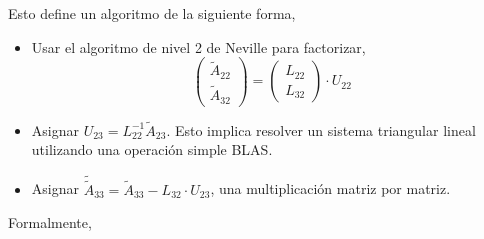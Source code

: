 \documentclass[a4paper,12pt]{article}
\begin{document}
Esto define un algoritmo de la siguiente forma, 

\begin{itemize}
	\item Usar el algoritmo de nivel 2 de Neville para factorizar,
	$$\begin{pmatrix} \widetilde{A}_{22}\\ \widetilde{A}_{32} 
\end{pmatrix} = \begin{pmatrix} L_{22} \\ L_{32} \end{pmatrix} \cdot U_{22}$$
	\item Asignar $U_{23} = L_{22}^{-1} \widetilde{A}_{23}$. Esto implica resolver un sistema triangular lineal utilizando una operaci\'on simple BLAS.
	\item Asignar $\widetilde{\widetilde{A}}_{33} = \widetilde{A}_{33} - L_{32}\cdot U_{23}$, una multiplicaci\'on matriz por matriz.
\end{itemize}

\bigskip

Formalmente,

\begin{algorithmic}[1]\label{neville3}
			\ENDFOR		
		\ENDFOR

			\ENDFOR
		\ENDFOR
	\ENDFOR
\end{algorithmic}

\end{document}
